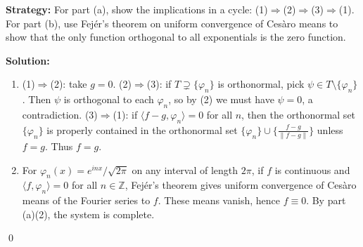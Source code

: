 \noindent\textbf{Strategy:} For part (a), show the implications in a cycle: (1)$\Rightarrow$(2)$\Rightarrow$(3)$\Rightarrow$(1). For part (b), use Fejér's theorem on uniform convergence of Cesàro means to show that the only function orthogonal to all exponentials is the zero function.

\bigskip\noindent\textbf{Solution:}
\begin{enumerate}[label=(\alph*)]
\item (1)$\Rightarrow$(2): take $g=0$. (2)$\Rightarrow$(3): if $T\supsetneq\{\varphi_n\}$ is orthonormal, pick $\psi\in T\setminus\{\varphi_n\}$. Then $\psi$ is orthogonal to each $\varphi_n$, so by (2) we must have $\psi=0$, a contradiction. (3)$\Rightarrow$(1): if $\langle f- g,\varphi_n\rangle=0$ for all $n$, then the orthonormal set $\{\varphi_n\}$ is properly contained in the orthonormal set $\{\varphi_n\}\cup\{\tfrac{f-g}{\|f-g\|}\}$ unless $f=g$. Thus $f=g$.
\item For $\varphi_n(x)=e^{inx}/\sqrt{2\pi}$ on any interval of length $2\pi$, if $f$ is continuous and $\langle f,\varphi_n\rangle=0$ for all $n\in\mathbb Z$, Fejér's theorem gives uniform convergence of Cesàro means of the Fourier series to $f$. These means vanish, hence $f\equiv 0$. By part (a)(2), the system is complete.
\end{enumerate}\qed


